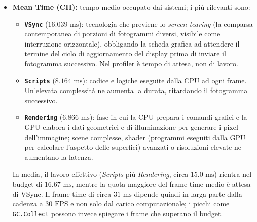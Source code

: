 \begin{itemize}
\item \textbf{Mean Time (CH):} tempo medio occupato dai sistemi; i più rilevanti sono:
 \begin{itemize}
     \item \textbf{\texttt{VSync}} ($16.039\text{ ms}$): tecnologia che previene lo \textit{screen tearing} (la comparsa contemporanea di porzioni di fotogrammi diversi, visibile come interruzione orizzontale), obbligando la scheda grafica ad attendere il termine del ciclo di aggiornamento del display prima di inviare il fotogramma successivo. Nel profiler è tempo di attesa, non di lavoro.
     \item \textbf{\texttt{Scripts}} ($8.164\text{ ms}$): codice e logiche eseguite dalla CPU ad ogni frame. Un'elevata complessità ne aumenta la durata, ritardando il fotogramma successivo.
     \item \textbf{\texttt{Rendering}} ($6.866\text{ ms}$): fase in cui la CPU prepara i comandi grafici e la GPU elabora i dati geometrici e di illuminazione per generare i pixel dell'immagine; scene complesse, shader (programmi eseguiti dalla GPU per calcolare l'aspetto delle superfici) avanzati o risoluzioni elevate ne aumentano la latenza.
 \end{itemize}
In media, il lavoro effettivo (\textit{Scripts} più \textit{Rendering}, circa $15.0\text{ ms}$) rientra nel budget di $16.67\text{ ms}$, mentre la quota maggiore del frame time medio è attesa di VSync. Il frame time di circa $31\text{ ms}$ dipende quindi in larga parte dalla cadenza a $30\text{ FPS}$ e non solo dal carico computazionale; i picchi come \texttt{GC.Collect} possono invece spiegare i frame che superano il budget.
\end{itemize}

